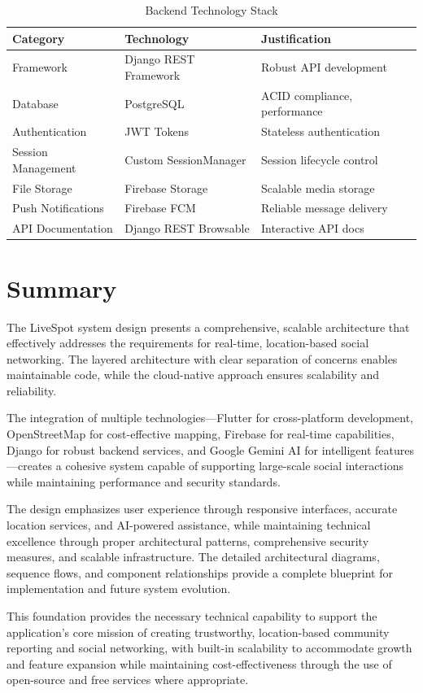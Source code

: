 \begin{table}[h!]
    \centering
    \caption{Backend Technology Stack}
    \label{tab:backend_stack}
    \begin{tabular}{lll}     
        \toprule
        Category & Technology & Justification \\
        \midrule
        Framework & Django REST Framework & Robust API development \\
        Database & PostgreSQL & ACID compliance, performance \\
        Authentication & JWT Tokens & Stateless authentication \\
        Session Management & Custom SessionManager & Session lifecycle control \\
        File Storage & Firebase Storage & Scalable media storage \\
        Push Notifications & Firebase FCM & Reliable message delivery \\
        API Documentation & Django REST Browsable & Interactive API docs \\
        \bottomrule
    \end{tabular}
\end{table}

\section{Summary}

The LiveSpot system design presents a comprehensive, scalable architecture that effectively addresses the requirements for real-time, location-based social networking. The layered architecture with clear separation of concerns enables maintainable code, while the cloud-native approach ensures scalability and reliability. 

The integration of multiple technologies—Flutter for cross-platform development, OpenStreetMap for cost-effective mapping, Firebase for real-time capabilities, Django for robust backend services, and Google Gemini AI for intelligent features—creates a cohesive system capable of supporting large-scale social interactions while maintaining performance and security standards.

The design emphasizes user experience through responsive interfaces, accurate location services, and AI-powered assistance, while maintaining technical excellence through proper architectural patterns, comprehensive security measures, and scalable infrastructure. The detailed architectural diagrams, sequence flows, and component relationships provide a complete blueprint for implementation and future system evolution.

This foundation provides the necessary technical capability to support the application's core mission of creating trustworthy, location-based community reporting and social networking, with built-in scalability to accommodate growth and feature expansion while maintaining cost-effectiveness through the use of open-source and free services where appropriate.
